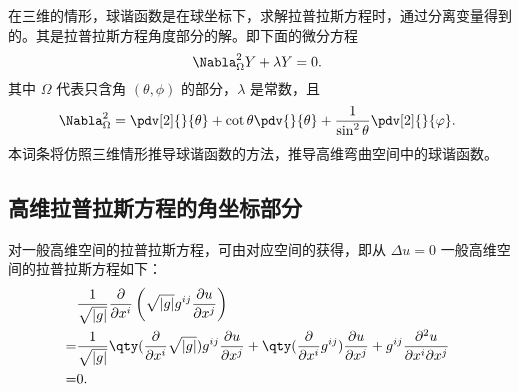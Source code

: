 

在三维的情形，球谐函数是在球坐标下，求解拉普拉斯方程时，通过分离变量得到的。其是拉普拉斯方程角度部分的解。即下面的微分方程
\begin{equation}
\Nabla_\Omega^2 Y+\lambda Y=0.~
\end{equation}
其中 $\Omega$ 代表只含角 $(\theta,\phi)$ 的部分，$\lambda$ 是常数，且
\begin{equation}
\Nabla^2_\Omega=\pdv[2]{}{\theta}+\cot\theta\pdv{}{\theta}+\frac{1}{\sin^2\theta}\pdv[2]{}{\varphi}.~
\end{equation}
本词条将仿照三维情形推导球谐函数的方法，推导高维弯曲空间中的球谐函数。

\subsection{高维拉普拉斯方程的角坐标部分}
对一般高维空间的拉普拉斯方程，可由对应空间的获得，即从 $\Delta u=0$ 一般高维空间的拉普拉斯方程如下：
\begin{equation}\label{eq_HDsphF_2}
\begin{aligned}
&\frac{1}{\sqrt{ \left\lvert g \right\rvert }} \frac{\partial }{\partial x^i} \left(\sqrt{ \left\lvert g \right\rvert }g^{ij} \frac{\partial u}{\partial x^j} \right)\\
=&\frac{1}{\sqrt{ \left\lvert g \right\rvert }} \qty(\frac{\partial }{\partial x^i} \sqrt{ \left\lvert g \right\rvert })g^{ij} \frac{\partial u}{\partial x^j}+\qty(\frac{\partial }{\partial x^i} g^{ij}) \frac{\partial u}{\partial x^j}+g^{ij}\frac{\partial^2 u}{\partial x^i\partial x^j}\\
=&0 .
\end{aligned}~
\end{equation}

